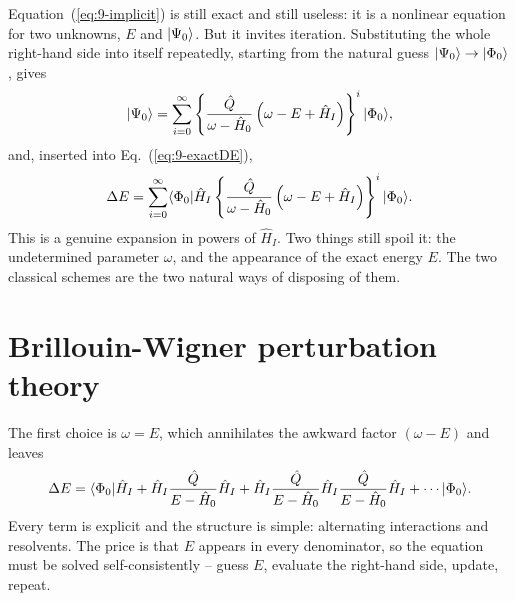 Equation~(\ref{eq:9-implicit}) is still exact and still useless: it is a
nonlinear equation for two unknowns, $E$ and $\vert \Psi_0 \rangle$.  But it invites
iteration.  Substituting the whole right-hand side into itself repeatedly,
starting from the natural guess $\vert \Psi_0 \rangle\to\vert \Phi_0 \rangle$, gives
\begin{equation}
  \vert \Psi_0 \rangle = \sum_{i=0}^{\infty}
    \left\{\frac{\hat{Q}}{\omega-\hat{H}_0}
      \left(\omega-E+\hat{H}_I\right)\right\}^{i}\vert \Phi_0 \rangle,
  \label{eq:9-iterated}
\end{equation}
and, inserted into Eq.~(\ref{eq:9-exactDE}),
\begin{equation}
  \Delta E = \sum_{i=0}^{\infty}
    \langle \Phi_0 | \hat{H}_I
    \left\{\frac{\hat{Q}}{\omega-\hat{H}_0}
      \left(\omega-E+\hat{H}_I\right)\right\}^{i} | \Phi_0 \rangle.
  \label{eq:9-generalseries}
\end{equation}
This is a genuine expansion in powers of $\hat{H}_I$.  Two things still spoil
it: the undetermined parameter $\omega$, and the appearance of the exact
energy $E$.  The two classical schemes are the two natural ways of disposing
of them.

\section{Brillouin-Wigner perturbation theory}
\label{sec:brillouinwigner}

The first choice is $\omega=E$, which annihilates the awkward factor
$(\omega-E)$ and leaves
\begin{equation}
  \Delta E = \langle \Phi_0 | 
    \hat{H}_I
    + \hat{H}_I\frac{\hat{Q}}{E-\hat{H}_0}\hat{H}_I
    + \hat{H}_I\frac{\hat{Q}}{E-\hat{H}_0}\hat{H}_I
      \frac{\hat{Q}}{E-\hat{H}_0}\hat{H}_I
    + \cdots | \Phi_0 \rangle.
  \label{eq:9-bwseries}
\end{equation}
Every term is explicit and the structure is simple: alternating interactions
and resolvents.  The price is that $E$ appears in every denominator, so the
equation must be solved self-consistently -- guess $E$, evaluate the
right-hand side, update, repeat.

